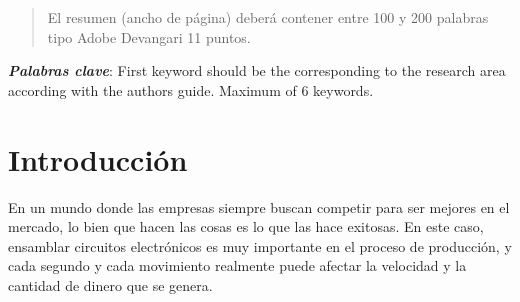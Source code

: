     
    
    
    \maketitle
    \thispagestyle{fancy}
    
    
    
    \begin{abstract}
    \noindent 
    El resumen (ancho de página) deberá contener entre 100 y 200 palabras tipo Adobe Devangari 11 puntos.
    
    \end{abstract}
    \textbf{\textit{Palabras clave}}: {First keyword should be the corresponding to the research area according with the authors guide. Maximum of 6 keywords.}
    
    \section{Introducción}
    
    En un mundo donde las empresas siempre buscan competir para ser mejores en el mercado, lo bien que hacen las cosas es lo que las hace exitosas. En este caso, ensamblar circuitos electrónicos es muy importante en el proceso de producción, y cada segundo y cada movimiento realmente puede afectar la velocidad y la cantidad de dinero que se genera.
    
